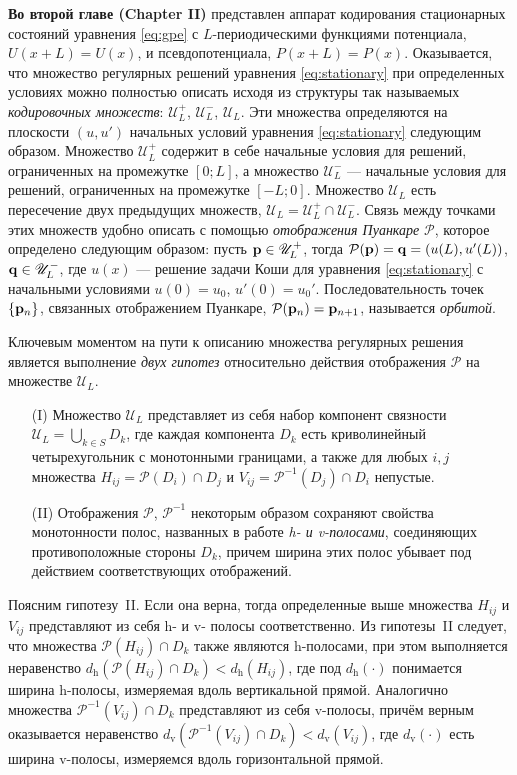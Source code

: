 \documentclass[candidate, href, colorlinks]{disser}
\begin{document}
\textbf{Во второй главе (Chapter II)} представлен аппарат кодирования стационарных состояний уравнения \eqref{eq:gpe} с $L$-периодическими функциями потенциала, $U(x + L) = U(x)$, и псевдопотенциала, $P(x + L) = P(x)$.
Оказывается, что множество регулярных решений уравнения \eqref{eq:stationary} при определенных условиях можно полностью описать исходя из структуры так называемых {\it кодировочных множеств}: $\mathscr{U}_L^+$, $\mathscr{U}_L^-$, $\mathscr{U}_L$.
Эти множества определяются на плоскости $(u, u')$ начальных условий уравнения \eqref{eq:stationary} следующим образом.
Множество $\mathscr{U}_L^+$ содержит в себе начальные условия для решений, ограниченных на промежутке $[0; L]$, а множество $\mathscr{U}_L^-$ --- начальные условия для решений, ограниченных на промежутке $[-L; 0]$.
Множество $\mathscr{U}_L$ есть пересечение двух предыдущих множеств, $\mathscr{U}_L = \mathscr{U}_L^+ \cap \mathscr{U}_L^-$.
Связь между точками этих множеств удобно описать с помощью {\it отображения Пуанкаре} $\mathcal{P}$, которое определено следующим образом: пусть $\vb{p} \in \mathscr{U}_L^+$, тогда $\mathcal{P} (\vb{p}) = \vb{q} = (u(L), u'(L))$, $\vb{q} \in \mathscr{U}_L^-$, где $u(x)$ --- решение задачи Коши для уравнения \eqref{eq:stationary} с начальными условиями $u(0) = u_0$, $u'(0) = u_0'$.
Последовательность точек $\{ \vb{p}_n \}$, связанных отображением Пуанкаре, $\mathcal{P}(\vb{p}_n) = \vb{p}_{n + 1}$, называется {\it орбитой}.

Ключевым моментом на пути к описанию множества регулярных решения является выполнение {\it двух гипотез} относительно действия отображения $\mathcal{P}$ на множестве $\mathscr{U}_L$.
\begin{itemize}
	\item[(I)] Множество $\mathscr{U}_L$ представляет из себя набор компонент связности $\mathscr{U}_L = \bigcup_{k \in S} D_k$, где каждая компонента $D_k$ есть криволинейный четырехугольник с монотонными границами, а также для любых $i, j$ множества $H_{ij} = \mathcal{P}(D_i) \cap D_j$ и $V_{ij} = \mathcal{P}^{-1}(D_j) \cap D_i$ непустые. 
	\item[(II)] Отображения $\mathcal{P}$, $\mathcal{P}^{-1}$ некоторым образом сохраняют свойства монотонности полос, названных в работе {\it h- и v-полосами}, соединяющих противоположные стороны $D_k$, причем ширина этих полос убывает под действием соответствующих отображений.
\end{itemize}
Поясним гипотезу~II.
Если она верна, тогда определенные выше множества $H_{ij}$ и $V_{ij}$ представляют из себя h- и v- полосы соответственно.
Из гипотезы~II следует, что множества $\mathcal{P}(H_{ij}) \cap D_k$ также являются h-полосами, при этом выполняется неравенство $d_{\mathrm{h}}(\mathcal{P}(H_{ij}) \cap D_k) < d_{\mathrm{h}}(H_{ij})$, где под $d_{\mathrm{h}}(\cdot)$ понимается ширина h-полосы, измеряемая вдоль вертикальной прямой.
Аналогично множества $\mathcal{P}^{-1}(V_{ij}) \cap D_k$ представляют из себя v-полосы, причём верным оказывается неравенство $d_{\mathrm{v}}(\mathcal{P}^{-1}(V_{ij}) \cap D_k) < d_{\mathrm{v}}(V_{ij})$, где $d_{\mathrm{v}}(\cdot)$ есть ширина v-полосы, измеряемся вдоль горизонтальной прямой.
\end{document}
